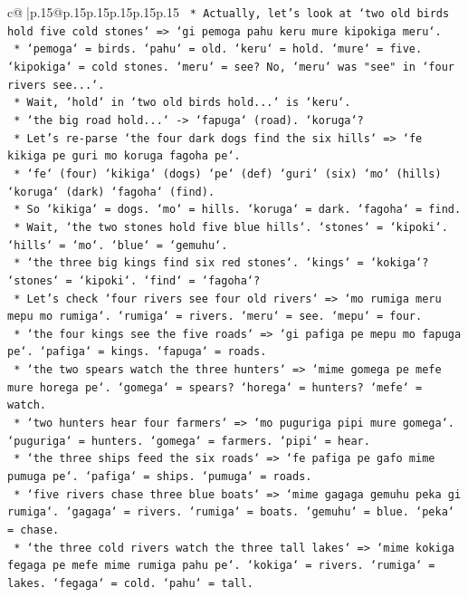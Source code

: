 \documentclass{article}
\begin{document}
{\begin{supertabular}{c@{$\;$}|p{.15\linewidth}@{}p{.15\linewidth}p{.15\linewidth}p{.15\linewidth}p{.15\linewidth}p{.15\linewidth}}
{{{\texttt{        *   Actually, let's look at `two old birds hold five cold stones` => `gi pemoga pahu keru mure kipokiga meru`.} \\
\texttt{        *   `pemoga` = birds. `pahu` = old. `keru` = hold. `mure` = five. `kipokiga` = cold stones. `meru` = see? No, `meru` was "see" in `four rivers see...`.} \\
\texttt{        *   Wait, `hold` in `two old birds hold...` is `keru`.} \\
\texttt{        *   `the big road hold...` {-}> `fapuga` (road). `koruga`?} \\
\texttt{        *   Let's re{-}parse `the four dark dogs find the six hills` => `fe kikiga pe guri mo koruga fagoha pe`.} \\
\texttt{        *   `fe` (four) `kikiga` (dogs) `pe` (def) `guri` (six) `mo` (hills) `koruga` (dark) `fagoha` (find).} \\
\texttt{        *   So `kikiga` = dogs. `mo` = hills. `koruga` = dark. `fagoha` = find.} \\
\texttt{        *   Wait, `the two stones hold five blue hills`. `stones` = `kipoki`. `hills` = `mo`. `blue` = `gemuhu`.} \\
\texttt{        *   `the three big kings find six red stones`. `kings` = `kokiga`? `stones` = `kipoki`. `find` = `fagoha`?} \\
\texttt{        *   Let's check `four rivers see four old rivers` => `mo rumiga meru mepu mo rumiga`. `rumiga` = rivers. `meru` = see. `mepu` = four.} \\
\texttt{        *   `the four kings see the five roads` => `gi pafiga pe mepu mo fapuga pe`. `pafiga` = kings. `fapuga` = roads.} \\
\texttt{        *   `the two spears watch the three hunters` => `mime gomega pe mefe mure horega pe`. `gomega` = spears? `horega` = hunters? `mefe` = watch.} \\
\texttt{        *   `two hunters hear four farmers` => `mo puguriga pipi mure gomega`. `puguriga` = hunters. `gomega` = farmers. `pipi` = hear.} \\
\texttt{        *   `the three ships feed the six roads` => `fe pafiga pe gafo mime pumuga pe`. `pafiga` = ships. `pumuga` = roads.} \\
\texttt{        *   `five rivers chase three blue boats` => `mime gagaga gemuhu peka gi rumiga`. `gagaga` = rivers. `rumiga` = boats. `gemuhu` = blue. `peka` = chase.} \\
\texttt{        *   `the three cold rivers watch the three tall lakes` => `mime kokiga fegaga pe mefe mime rumiga pahu pe`. `kokiga` = rivers. `rumiga` = lakes. `fegaga` = cold. `pahu` = tall.} \\
}}}
\end{supertabular}}
\end{document}
